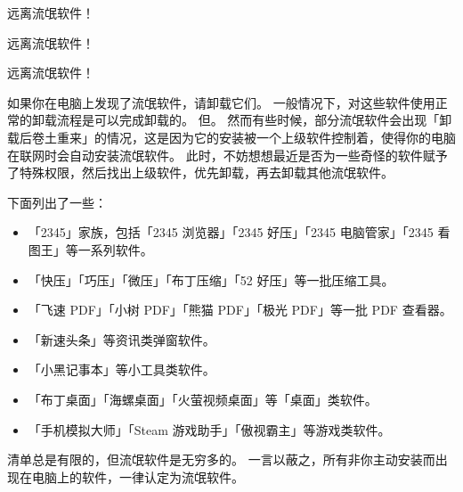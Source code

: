 \begin{warning}
  \centering
  远离流氓软件！\par
  \large 远离流氓软件！\par
  \LARGE 远离流氓软件！\par
\end{warning}

如果你在电脑上发现了流氓软件，请卸载它们。
一般情况下，对这些软件使用正常的卸载流程是可以完成卸载的。
但。
然而有些时候，部分流氓软件会出现「卸载后卷土重来」的情况，这是因为它的安装被一个上级软件控制着，使得你的电脑在联网时会自动安装流氓软件。
此时，不妨想想最近是否为一些奇怪的软件赋予了特殊权限，然后找出上级软件，优先卸载，再去卸载其他流氓软件。

下面列出了一些：

\begin{itemize}
  \item 「2345」家族，包括「2345 浏览器」「2345 好压」「2345 电脑管家」「2345 看图王」等一系列软件。
  \item 「快压」「巧压」「微压」「布丁压缩」「52 好压」等一批压缩工具。
  \item 「飞速 PDF」「小树 PDF」「熊猫 PDF」「极光 PDF」等一批 PDF 查看器。
  \item 「新速头条」等资讯类弹窗软件。
  \item 「小黑记事本」等小工具类软件。
  \item 「布丁桌面」「海螺桌面」「火萤视频桌面」等「桌面」类软件。
  \item 「手机模拟大师」「Steam 游戏助手」「傲视霸主」等游戏类软件。
\end{itemize}

清单总是有限的，但流氓软件是无穷多的。
一言以蔽之，所有非你主动安装而出现在电脑上的软件，一律认定为流氓软件。

\practice

